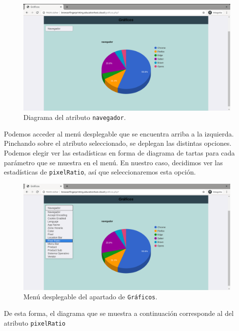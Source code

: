 \begin{figure}[H]
	\centering
	\includegraphics[width=1\textwidth]{Images/navegadorChart.png}
	\caption{Diagrama del atributo \texttt{navegador}.}
	\label{fig:navegadorChart}
\end{figure}

Podemos acceder al menú desplegable que se encuentra arriba a la izquierda. Pinchando sobre el atributo seleccionado, se deplegan las distintas opciones. Podemos elegir ver las estadísticas en forma de diagrama de tartas para cada parámetro que se muestra en el menú. En nuestro caso, decidimos ver las estadísticas de \texttt{pixelRatio}, así que seleccionaremos esta opción.

\begin{figure}[H]
	\centering
	\includegraphics[width=1\textwidth]{Images/menuChart.png}
	\caption{Menú desplegable del apartado de \texttt{Gráficos}.}
	\label{fig:menuChart}
\end{figure}

De esta forma, el diagrama que se muestra a continuación corresponde al del atributo \texttt{pixelRatio}

